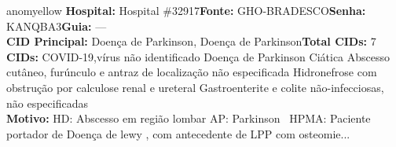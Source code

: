 \documentclass[a4paper,10pt]{article}
\begin{document}
\begin{anomalycard}[Interna\c{c}\~{a}o \#120192 | Pac. \#51066 | MODERADO (z=2.03) | LOS: 15d | 08/03/2026\,$\to$\,—]{anomyellow}
\textbf{Hospital:} Hospital \#32917\quad \textbf{Fonte:} GHO-BRADESCO\quad \textbf{Senha:} KANQBA3\quad \textbf{Guia:} ---\\

\textbf{CID Principal:} {\small Doença de Parkinson, Doença de Parkinson}\quad\textbf{Total CIDs:} 7\\

\textbf{CIDs:} {\scriptsize COVID-19,vírus não identificado \textbar{} Doença de Parkinson \textbar{} Ciática \textbar{} Abscesso cutâneo, furúnculo e antraz de localização não especificada \textbar{} Hidronefrose com obstrução por calculose renal e ureteral \textbar{} Gastroenterite e colite não-infecciosas, não especificadas}\\

\textbf{Motivo:} {\scriptsize HD: Abscesso em região lombar  AP: Parkinson   HPMA: Paciente portador de Doença de lewy , com antecedente de LPP com osteomie...}\\



\end{anomalycard}
\end{document}

